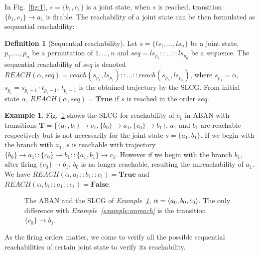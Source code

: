 \documentclass{article}
\newcommand{\acm}[3]{\{#1\}\rightarrow#3}
\newcommand{\ac}[3]{$\{#1\}\rightarrow#3$}
\theoremstyle{definition}
\newtheorem{definition}{Definition}
\newtheorem{example}{Example}
\DeclarePairedDelimiter{\init}{\langle}{\rangle}
\begin{document}
In Fig.~\ref{fig:1}, $s=\{ b_1,c_1\}$ is a joint state, when $s$ is reached, transition \ac{b_1,c_1}{a_0}{a_1} is firable.
The reachability of a joint state can be then formulated as sequential reachability:
\begin{definition}[Sequential reachability]
Let $s=\{ls_1,\ldots,ls_n\}$ be a joint state, $p_1,\ldots ,p_n$ be a permutation of $1,\ldots ,n$ and $seq=ls_{p_1}::\ldots::ls_{p_n}$ be a sequence.
The sequential reachability of $seq$ is denoted %
$REACH(\alpha,seq)=reach(s_{p_1},ls_{p_1})::\ldots::reach(s_{p_n},ls_{p_n})$, where $s_{p_1}=\alpha$, $s_{p_i}=s_{p_i-1}\cdot t_{p_i-1}$, $t_{p_i-1}$ is the obtained trajectory by the SLCG.
From initial state $\alpha$, $REACH(\alpha,seq)=\mathbf{True}$ if $s$ is reached in the order $seq$.
\end{definition}

\begin{example}\label{example:order}
Fig.~\ref{fig:5} shows the SLCG for reachability of $c_1$ in ABAN with transitions $\mathbf{T}=\{\acm{a_1,b_1}{c_0}{c_1},\acm{b_0}{a_0}{a_1},\acm{c_0}{b_0}{b_1}\}$.
$a_1$ and $b_1$ are reachable respectively but is not necessarily for the joint state $s=\{a_1,b_1\}$.
If we begin with the branch with $a_1$, $s$ is reachable with trajectory $\acm{b_0}{a_0}{a_1}::\acm{c_0}{b_0}{b_1}::\acm{a_1,b_1}{c_0}{c_1}$. 
However if we begin with the branch $b_1$, after firing $\acm{c_0}{b_0}{b_1}$, $b_0$ is no longer reachable, resulting the unreachability of $a_1$.
We have $REACH(\alpha,a_1::b_1::c_1)=\mathbf{True}$ and $REACH(\alpha,b_1::a_1::c_1)=\mathbf{False}$.
\end{example}
\begin{figure}[ht]
\centering

\caption{The ABAN and the SLCG of \textit{Example~\ref{example:order}}, $\alpha=\init{ a_0,b_0,c_0}$. 
The only difference with \textit{Example~\ref{example:unreach}} is the transition \ac{c_0}{b_0}{b_1}.
}
\label{fig:5}
\end{figure}



As the firing orders matter, we come to verify all the possible sequential reachabilities of certain joint state to verify its reachability.
\end{document}
